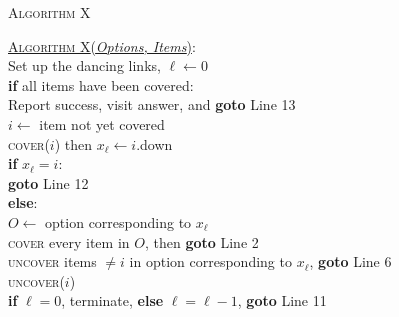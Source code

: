 \documentclass[aspectratio=169]{beamer}
\begin{document}
\begin{frame}{\textsc{Algorithm X}}
    \begin{nalgo}
    \underline{\textsc{Algorithm X}(\emph{Options, Items})}:
    \\\label{}  Set up the dancing links, $\ell \gets 0$ 
    \\\label{}  \textbf{if} all items have been covered:\+
    \\\label{}      Report success, visit answer, and \textbf{goto} Line 13 \-
    \\\label{}  $i \gets $ item not yet covered
    \\\label{}  \textsc{cover}($i$) then $x_\ell \gets i.$down
    \\\label{}  \textbf{if} $x_\ell = i$:\+
    \\\label{}      \textbf{goto} Line 12 \-
    \\\label{}  \textbf{else}:\+
    \\\label{}      $O \gets$ option corresponding to $x_\ell$ 
    \\\label{}      \textsc{cover} every item in $O$, then \textbf{goto} Line 2\-
    \\\label{}  \textsc{uncover} items $\neq i$ in option corresponding to $x_\ell$, \textbf{goto} Line 6
    \\\label{}  \textsc{uncover}($i$)
    \\\label{}  \textbf{if} $\ell = 0$, terminate, \textbf{else} $\ell = \ell - 1$, \textbf{goto} Line 11
    \end{nalgo}
\end{frame}
\end{document}
